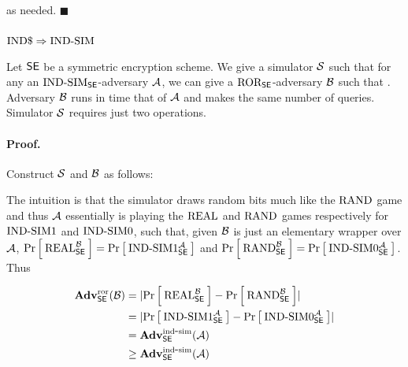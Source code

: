 as needed. $\blacksquare$

\subsubsection*{$\INDRAND \Rightarrow \INDSIM$}

\begin{theorem*}
Let $\SE$ be a symmetric encryption scheme. We give a simulator $\simu$ such
that for any  an
$\INDSIM_\SE$-adversary $\advA$, we can give 
a $\ROR_\SE$-adversary $\advB$ such that
\bnm
  \AdvINDSIM{\SE,\simu}{\advA} \le \AdvROR{\SE}{\advB} \;.
\enm
Adversary $\advB$ runs in time that of $\advA$ and makes the same number of
queries. Simulator $\simu$ requires just two operations.
\end{theorem*}

\paragraph{Proof.}

Construct $\simu$ and $\advB$ as follows:



The intuition is that the simulator draws random bits much like the
$\RORrand$ game and thus $\advA$  essentially is playing the
$\RORreal$ and $\RORrand$ games respectively for
$\INDSIM1$ and $\INDSIM0$, such that, given $\advB$ is just an elementary
wrapper over $\advA$,
$\Prob{\RORreal_{\SEscheme}^{\advB}} = \Prob{\INDSIM1_{\SEscheme}^{\advA}}$
and
$\Prob{\RORrand_{\SEscheme}^{\advB}} = \Prob{\INDSIM0_{\SEscheme}^{\advA}}$.
Thus

\begin{align*}
  \AdvROR{\SEscheme}{\advB} &=
  \absv{\Prob{\RORreal^{\advB}_{\SEscheme}} - \Prob{\RORrand^{\advB}_{\SEscheme}}} \\
  &= \absv{\Prob{\INDSIM1^{\advA}_{\SEscheme}} - \Prob{\INDSIM0^{\advA}_{\SEscheme}}} \\
  &= \AdvINDSIM{\SEscheme}{\advA} \\
  &\geq \AdvINDSIM{\SEscheme}{\advA}
\end{align*}

